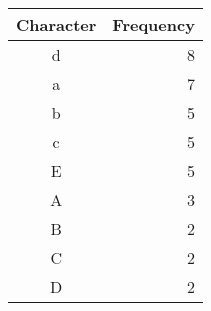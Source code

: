 {\begin{center} \begin{tabular}{c | r}
    \textbf{Character} & \textbf{Frequency} \\ \hline
    d                  &                  8 \\
    a                  &                  7 \\
    b                  &                  5 \\
    c                  &                  5 \\
    E                  &                  5 \\
    A                  &                  3 \\
    B                  &                  2 \\
    C                  &                  2 \\
    D                  &                  2 \\
\end{tabular} \end{center}

}
